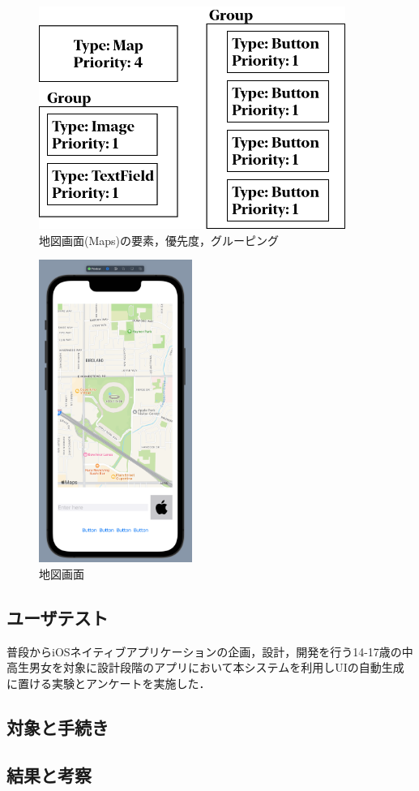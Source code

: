 \begin{figure}[htbp]
  \begin{minipage}{\hsize}
    \begin{center}
       \includegraphics[width=100mm]{img/Maps_ViewStructure.png}
    \end{center}
    \caption{地図画面(Maps)の要素，優先度，グルーピング}
    \label{fig:Maps_ViewStructure}
  \end{minipage}
\end{figure}

\begin{figure}[htbp]
  \begin{minipage}{\hsize}
    \begin{center}
       \includegraphics[width=50mm]{img/Maps_autogen.png}
    \end{center}
    \caption{地図画面}
    \label{fig:Maps_autogen}
  \end{minipage}
\end{figure}


\subsection{ユーザテスト}
普段からiOSネイティブアプリケーションの企画，設計，開発を行う14-17歳の中高生男女を対象に設計段階のアプリにおいて本システムを利用しUIの自動生成に置ける実験とアンケートを実施した．

\subsection{対象と手続き}

\subsection{結果と考察}
